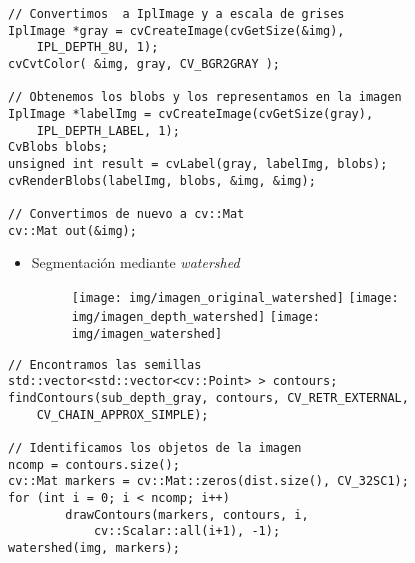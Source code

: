 \documentclass[notes,slidesec,a4]{seminar}
\begin{document}

\begin{hslide}\footnotesize
\begin{lstlisting}
// Convertimos  a IplImage y a escala de grises
IplImage *gray = cvCreateImage(cvGetSize(&img), 
	IPL_DEPTH_8U, 1);
cvCvtColor( &img, gray, CV_BGR2GRAY );

// Obtenemos los blobs y los representamos en la imagen
IplImage *labelImg = cvCreateImage(cvGetSize(gray), 
	IPL_DEPTH_LABEL, 1);
CvBlobs blobs;
unsigned int result = cvLabel(gray, labelImg, blobs);
cvRenderBlobs(labelImg, blobs, &img, &img);

// Convertimos de nuevo a cv::Mat
cv::Mat out(&img);
\end{lstlisting}\normalsize
\end{hslide}


\begin{hslide}
\begin{itemize}
\item Segmentación mediante \textit{watershed}
\begin{figure}
\begin{center}
	\texttt{[image: img/imagen\_original\_watershed]}
	\texttt{[image: img/imagen\_depth\_watershed]}
	\texttt{[image: img/imagen\_watershed]}
\end{center}
\end{figure}
\end{itemize}
\end{hslide}


\begin{hslide}\footnotesize
\begin{lstlisting}
// Encontramos las semillas
std::vector<std::vector<cv::Point> > contours;
findContours(sub_depth_gray, contours, CV_RETR_EXTERNAL,
	CV_CHAIN_APPROX_SIMPLE);

// Identificamos los objetos de la imagen
ncomp = contours.size();
cv::Mat markers = cv::Mat::zeros(dist.size(), CV_32SC1);
for (int i = 0; i < ncomp; i++)
        drawContours(markers, contours, i, 
        	cv::Scalar::all(i+1), -1);
watershed(img, markers);
\end{lstlisting}\normalsize
\end{hslide}
\end{document}

